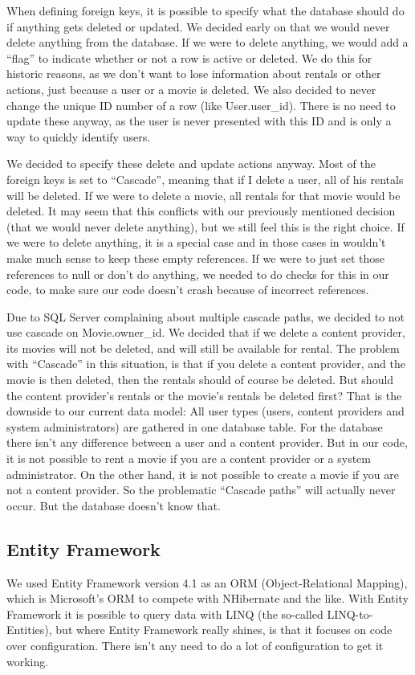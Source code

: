 When defining foreign keys, it is possible to specify what the database should do if anything gets deleted or updated. We decided early on that we would never delete anything from the database. If we were to delete anything, we would add a ``flag'' to indicate whether or not a row is active or deleted. We do this for historic reasons, as we don't want to lose information about rentals or other actions, just because a user or a movie is deleted.
We also decided to never change the unique ID number of a row (like User.user\_id). There is no need to update these anyway, as the user is never presented with this ID and is only a way to quickly identify users.

We decided to specify these delete and update actions anyway. Most of the foreign keys is set to ``Cascade'', meaning that if I delete a user, all of his rentals will be deleted. If we were to delete a movie, all rentals for that movie would be deleted. It may seem that this conflicts with our previously mentioned decision (that we would never delete anything), but we still feel this is the right choice. If we were to delete anything, it is a special case and in those cases in wouldn't make much sense to keep these empty references. If we were to just set those references to null or don't do anything, we needed to do checks for this in our code, to make sure our code doesn't crash because of incorrect references.

Due to SQL Server complaining about multiple cascade paths, we decided to not use cascade on Movie.owner\_id. We decided that if we delete a content provider, its movies will not be deleted, and will still be available for rental. The problem with ``Cascade'' in this situation, is that if you delete a content provider, and the movie is then deleted, then the rentals should of course be deleted. But should the content provider's rentals or the movie's rentals be deleted first?
That is the downside to our current data model: All user types (users, content providers and system administrators) are gathered in one database table. For the database there isn't any difference between a user and a content provider. But in our code, it is not possible to rent a movie if you are a content provider or a system administrator. On the other hand, it is not possible to create a movie if you are not a content provider. So the problematic ``Cascade paths'' will actually never occur. But the database doesn't know that.

\subsection{Entity Framework}
\label{Design_Database_EntityFramework}
We used Entity Framework version 4.1 as an ORM (Object-Relational Mapping), which is Microsoft's ORM to compete with NHibernate and the like. With Entity Framework it is possible to query data with LINQ (the so-called LINQ-to-Entities), but where Entity Framework really shines, is that it focuses on code over configuration. There isn't any need to do a lot of configuration to get it working.


